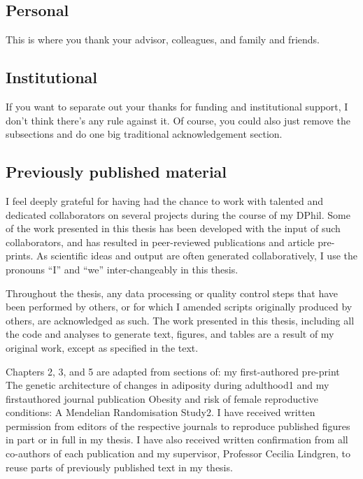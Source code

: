\subsection*{Personal}

This is where you thank your advisor, colleagues, and family and friends.


\subsection*{Institutional}

If you want to separate out your thanks for funding and institutional support, I don't think there's any rule against it.  Of course, you could also just remove the subsections and do one big traditional acknowledgement section.

\subsection*{Previously published material}
I feel deeply grateful for having had the chance to work with talented and dedicated
collaborators on several projects during the course of my DPhil. Some of the work
presented in this thesis has been developed with the input of such collaborators,
and has resulted in peer-reviewed publications and article pre-prints. As scientific
ideas and output are often generated collaboratively, I use the pronouns ``I'' and
``we'' inter-changeably in this thesis.

Throughout the thesis, any data processing or quality control steps that have been
performed by others, or for which I amended scripts originally produced by others,
are acknowledged as such. The work presented in this thesis, including all the code
and analyses to generate text, figures, and tables are a result of my original work,
except as specified in the text.

Chapters 2, 3, and 5 are adapted from sections of: my first-authored pre-print
The genetic architecture of changes in adiposity during adulthood1 and my firstauthored
journal publication Obesity and risk of female reproductive conditions:
A Mendelian Randomisation Study2. I have received written permission from
editors of the respective journals to reproduce published figures in part or in full
in my thesis. I have also received written confirmation from all co-authors of
each publication and my supervisor, Professor Cecilia Lindgren, to reuse parts
of previously published text in my thesis.